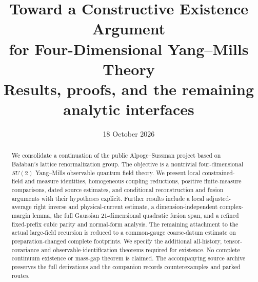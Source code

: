 \documentclass[11pt]{article}
\begin{document}
\title{Toward a Constructive Existence Argument\\for Four-Dimensional Yang--Mills Theory\\[8pt]\large Results, proofs, and the remaining analytic interfaces}
\author{}
\date{18 October 2026}
\maketitle
\begin{abstract}
We consolidate a continuation of the public Alpoge--Sussman project
based on Ba{\l}aban's lattice renormalization group. The objective is a
nontrivial four-dimensional \(SU(2)\) Yang--Mills observable quantum field
theory. We present local constrained-field and measure identities,
homogeneous coupling reductions, positive finite-measure comparisons,
dated source estimates, and conditional reconstruction and fusion
arguments with their hypotheses explicit. Further results include a
local adjusted-average right inverse and physical-current estimate,
a dimension-independent complex-margin lemma, the full Gaussian
21-dimensional quadratic fusion span, and a refined fixed-prefix cubic
parity and normal-form analysis. The remaining attachment to the actual
large-field recursion is reduced to a common-gauge coarse-datum estimate
on preparation-changed complete footprints. We specify the additional
all-history, tensor-covariance and observable-identification theorems
required for existence. No complete continuum existence or mass-gap
theorem is claimed. The accompanying source archive preserves the full
derivations and the companion records counterexamples and parked routes.
\end{abstract}
\begingroup
\small
\setlength{\parskip}{0pt}
\tableofcontents
\endgroup
\clearpage







\clearpage
\begingroup
\small

\endgroup
\end{document}
